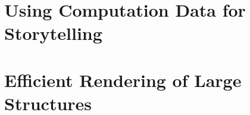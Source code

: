 %
%
%
%
%
%
%
%


%
%
%
%
% 
%
%
%
%


\section{Using Computation Data for Storytelling}

\section{Efficient Rendering of Large Structures}

